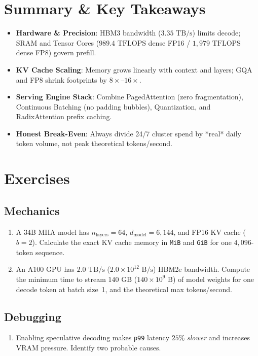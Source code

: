 \section{Summary \protect\& Key Takeaways}

\begin{itemize}[leftmargin=18pt]
  \item \textbf{Hardware \& Precision}: HBM3 bandwidth ($3.35\text{ TB/s}$) limits decode; SRAM and Tensor Cores ($989.4\text{ TFLOPS}$ dense FP16 / $1,979\text{ TFLOPS}$ dense FP8) govern prefill.
  \item \textbf{KV Cache Scaling}: Memory grows linearly with context and layers; GQA and FP8 shrink footprints by $8\times$--$16\times$.
  \item \textbf{Serving Engine Stack}: Combine PagedAttention (zero fragmentation), Continuous Batching (no padding bubbles), Quantization, and RadixAttention prefix caching.
  \item \textbf{Honest Break-Even}: Always divide 24/7 cluster spend by *real* daily token volume, not peak theoretical tokens/second.
\end{itemize}

\section{Exercises}

\subsection*{Mechanics}
\begin{enumerate}[label=\textbf{Exercise~\thechapter.\arabic*}, leftmargin=*]
  \item A 34B MHA model has $n_{\text{layers}} = 64$, $d_{\text{model}} = 6,144$, and FP16 KV cache ($b=2$). Calculate the exact KV cache memory in \texttt{MiB} and \texttt{GiB} for one $4,096$-token sequence.
  \item An A100 GPU has $2.0\text{ TB/s}$ ($2.0 \times 10^{12}\text{ B/s}$) HBM2e bandwidth. Compute the minimum time to stream $140\text{ GB}$ ($140 \times 10^9\text{ B}$) of model weights for one decode token at batch size~1, and the theoretical max tokens/second.
\end{enumerate}

\subsection*{Debugging}
\begin{enumerate}[label=\textbf{Exercise~\thechapter.\arabic*}, leftmargin=*, start=3]
  \item Enabling speculative decoding makes \texttt{p99} latency $25\%$ \emph{slower} and increases VRAM pressure. Identify two probable causes.
\end{enumerate}

